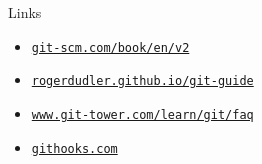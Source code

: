 \documentclass[10pt]{beamer}
\newcommand{\urlCustom}[1]{\href{https://#1}{\textcolor{greyCustom}{\texttt{#1}}}}
\begin{document}
\begin{frame}{Links}
	\begin{itemize}
		\item\urlCustom{git-scm.com/book/en/v2}
		\item\urlCustom{rogerdudler.github.io/git-guide}
		\item\urlCustom{www.git-tower.com/learn/git/faq}
		\item\urlCustom{githooks.com}
	\end{itemize}
	\begin{center}\doclicenseThis\end{center}
\end{frame}
\end{document}
